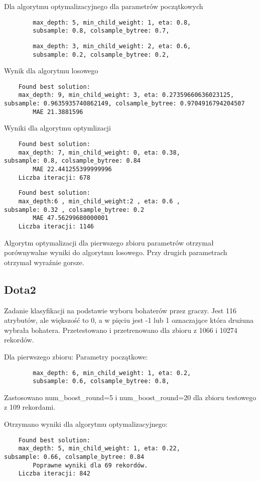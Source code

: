 \documentclass[a4paper,12p]{article}
\begin{document}
	Dla algorytmu optymalizacyjnego dla parametrów początkowych
	\begin{verbatim}
		max_depth: 5, min_child_weight: 1, eta: 0.8,
		subsample: 0.8, colsample_bytree: 0.7,
	\end{verbatim}
	\begin{verbatim}
		max_depth: 3, min_child_weight: 2, eta: 0.6,
		subsample: 0.2, colsample_bytree: 0.2,
	\end{verbatim}
	
	
	Wynik dla algorytmu losowego
	\begin{verbatim}
	Found best solution:
	max_depth: 9, min_child_weight: 3, eta: 0.27359660636023125, 
subsample: 0.9635935740862149, colsample_bytree: 0.9704916794204507
        MAE 21.3881596
	\end{verbatim}
	
	Wyniki dla algorytmu optymlizacji
	\begin{verbatim}
	Found best solution:
	max_depth: 7, min_child_weight: 0, eta: 0.38,
subsample: 0.8, colsample_bytree: 0.84
        MAE 22.441255399999996
	Liczba iteracji: 678
	\end{verbatim}
	
	\begin{verbatim}
	Found best solution: 
	max_depth:6 , min_child_weight:2 , eta: 0.6 ,
subsample: 0.32 , colsample_bytree: 0.2 
        MAE 47.56299680000001
	Liczba iteracji: 1146
	\end{verbatim}

	Algorytm optymalizacji dla pierwszego zbioru parametrów otrzymał porównywalne wyniki do algorytmu losowego. Przy drugich parametrach otrzymał wyraźnie gorsze.
	
	\subsection{Dota2}
	Zadanie klasyfikacji na podstawie wyboru bohaterów przez graczy. Jest 116 atrybutów, ale większość to 0, a w pięciu jest -1 lub 1 oznaczające która drużuna wybrała bohatera. Przetestowano i przetrenowano dla zbioru z 1066 i 10274 rekordów.

	Dla pierwszego zbioru:
	Parametry początkowe:
	\begin{verbatim}
		max_depth: 6, min_child_weight: 1, eta: 0.2,
		subsample: 0.6, colsample_bytree: 0.8,	
	\end{verbatim}
	Zastosowano num_boost_round=5 i num_boost_round=20 dla zbioru testowego z 109 rekordami.
	
	Otrzymano wyniki dla algorytmu optymalizacyjnego:
	\begin{verbatim}
	Found best solution:
	max_depth: 5, min_child_weight: 1, eta: 0.22,
subsample: 0.66, colsample_bytree: 0.84
        Poprawne wyniki dla 69 rekordów.
	Liczba iteracji: 842
	\end{verbatim}
	
\end{document}

